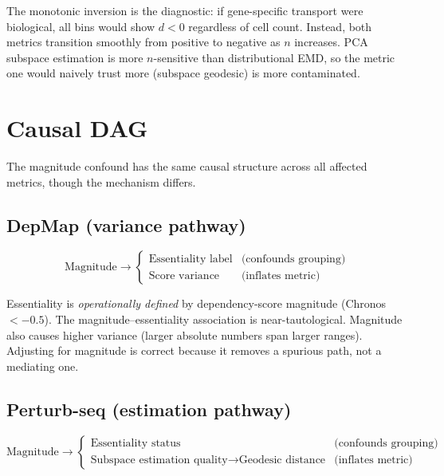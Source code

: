 \documentclass[11pt]{article}
\begin{document}
The monotonic inversion is the diagnostic: if gene-specific transport
were biological, all bins would show $d < 0$ regardless of cell count.
Instead, both metrics transition smoothly from positive to negative as
$n$ increases. PCA subspace estimation is more $n$-sensitive than
distributional EMD, so the metric one would naively trust more
(subspace geodesic) is more contaminated.

\section{Causal DAG}
\label{sec:dag}

The magnitude confound has the same causal structure across all
affected metrics, though the mechanism differs.

\subsection{DepMap (variance pathway)}

\begin{equation*}
\text{Magnitude} \rightarrow
\begin{cases}
\text{Essentiality label} & \text{(confounds grouping)} \\
\text{Score variance} & \text{(inflates metric)}
\end{cases}
\end{equation*}

Essentiality is \emph{operationally defined} by dependency-score
magnitude (Chronos $< -0.5$). The magnitude--essentiality association is
near-tautological. Magnitude also causes higher variance (larger
absolute numbers span larger ranges). Adjusting for magnitude is correct
because it removes a spurious path, not a mediating one.

\subsection{Perturb-seq (estimation pathway)}

\begin{equation*}
\text{Magnitude} \rightarrow
\begin{cases}
\text{Essentiality status} & \text{(confounds grouping)} \\
\text{Subspace estimation quality} \rightarrow \text{Geodesic distance}
  & \text{(inflates metric)}
\end{cases}
\end{equation*}
\end{document}
